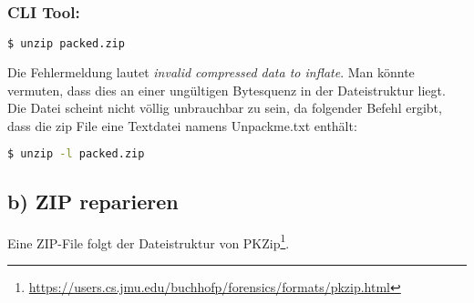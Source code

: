 \subsubsection*{CLI Tool:}

\begin{lstlisting}[language=bash]
    $ unzip packed.zip
\end{lstlisting}

Die Fehlermeldung lautet \textit{invalid compressed data to inflate}.
Man könnte vermuten, dass dies an einer ungültigen Bytesquenz in der Dateistruktur liegt.
Die Datei scheint nicht völlig unbrauchbar zu sein, da folgender Befehl ergibt, dass die zip File
eine Textdatei namens Unpackme.txt enthält:

\begin{lstlisting}[language=bash]
    $ unzip -l packed.zip
\end{lstlisting}

\subsection*{b) ZIP reparieren}

Eine ZIP-File folgt der Dateistruktur von PKZip\footnote{\url{https://users.cs.jmu.edu/buchhofp/forensics/formats/pkzip.html}}.


